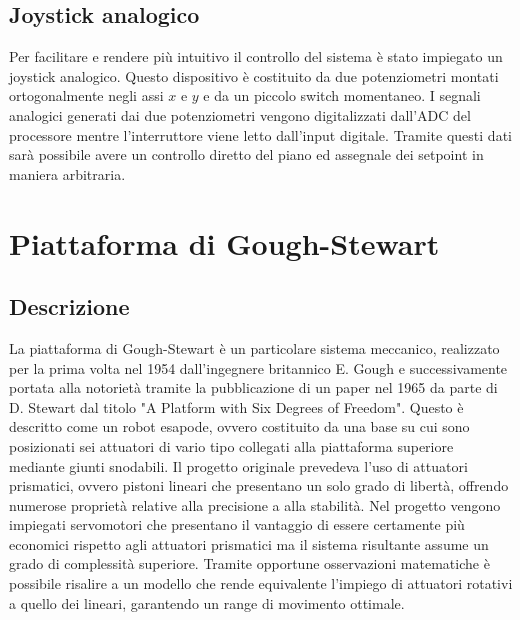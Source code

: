 \documentclass[12pt,twoside,openright]{article}
\begin{document}
\subsection{Joystick analogico}\label{joystick}
Per facilitare e rendere più intuitivo il controllo del sistema è stato impiegato un joystick analogico. Questo dispositivo è costituito da due potenziometri montati ortogonalmente negli assi $x$ e $y$ e da un piccolo switch momentaneo. I segnali analogici generati dai due potenziometri vengono digitalizzati dall'ADC del processore mentre l'interruttore viene letto dall'input digitale. Tramite questi dati sarà possibile avere un controllo diretto del piano ed assegnale dei setpoint in maniera arbitraria.%

\newpage

\section{Piattaforma di Gough-Stewart}\label{pianostewart}



\subsection{Descrizione}\label{piattaformastewart}
La piattaforma di Gough-Stewart è un particolare sistema meccanico, realizzato per la prima volta nel 1954 dall'ingegnere britannico E. Gough e successivamente portata alla notorietà tramite la pubblicazione di un paper nel 1965 da parte di D. Stewart dal titolo "A Platform with Six Degrees of Freedom". Questo è descritto come un robot esapode, ovvero costituito da una base su cui sono posizionati sei attuatori di vario tipo collegati alla piattaforma superiore mediante giunti snodabili. Il progetto originale prevedeva l'uso di attuatori prismatici, ovvero pistoni lineari che presentano un solo grado di libertà, offrendo numerose proprietà relative alla precisione a alla stabilità. Nel progetto vengono impiegati servomotori che presentano il vantaggio di essere certamente più economici rispetto agli attuatori prismatici ma il sistema risultante assume un grado di complessità superiore. Tramite opportune osservazioni matematiche è possibile risalire a un modello che rende equivalente l'impiego di attuatori rotativi a quello dei lineari, garantendo un range di movimento ottimale.
\end{document}
